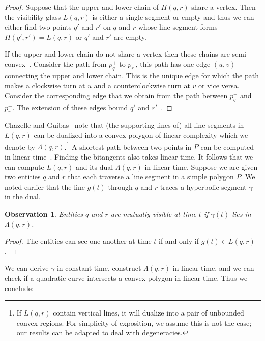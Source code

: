 \documentclass[UKenglish]{lipics-v2019}
\newtheorem{observation}{Observation}
\begin{document}
\begin {proof}
Suppose that the upper and lower chain of $H(q,r)$ share a vertex. Then the visibility glass $L(q,r)$ is either a single segment or empty and thus we can either find two points $q'$ and $r'$ on $q$ and $r$ whose line segment forms $H(q', r') = L(q,r)$ or $q'$ and $r'$ are empty. 

If the upper and lower chain do not share a vertex then these chains are semi-convex~\cite{guibas1989optimal}. Consider the path from $p_q^+$ to $p_r^-$, this path has one edge $(u,v)$ connecting the upper and lower chain. This is the unique edge for which the path makes a clockwise turn at $u$ and a counterclockwise turn at $v$ or vice versa. Consider the corresponding edge that we obtain from the path between $p_q^-$ and $p_r^+$. The extension of these edges bound $q'$ and $r'$~\cite{Chazelle1989}.
\end {proof}


Chazelle and Guibas~\cite{Chazelle1989} note that (the supporting lines of) all
line segments in $L(q,r)$ can be dualized into a convex polygon of linear
complexity which we denote by $\Lambda(q,r)$.\footnote {If $L(q,r)$ contain vertical lines, it will dualize into a pair of unbounded convex regions. For simplicity of exposition, we assume this is not the case; our results can be adapted to deal with degeneracies.}
A shortest path between two points in
$P$ can be computed in linear time~\cite{GuibasHLST87}. Finding the bitangents also takes linear time. It follows that we can compute $L(q,r)$ and its dual $\Lambda(q,r)$ in linear time.
Suppose we are given two entities $q$ and $r$ that each traverse a line segment in a simple polygon $P$. 
We noted earlier that the line $g(t)$ through $q$ and $r$ traces a hyperbolic segment $\gamma$ in the dual.

\begin{observation}
  \label{obs:visible}
  Entities $q$ and $r$ are mutually visible at time $t$ if
  $\gamma(t)$ lies in $\Lambda(q,r)$.
\end{observation}
\begin {proof}
The entities can see one another at time $t$ if and only if $g(t) \in L(q,r)$.
\end {proof}



We can derive $\gamma$ in constant time, construct $\Lambda(q,r)$ in linear time, and we can check if a quadratic curve intersects a convex polygon in linear time. Thus we conclude:
\end{document}
